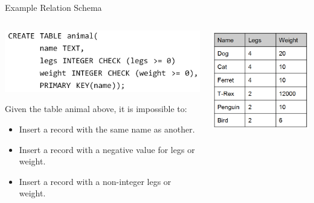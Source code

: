 \documentclass[aspectratio=169]{../latex_main/tntbeamer}  %
\begin{document}
	\begin{frame}{Example Relation Schema}
	    \begin{columns}
	        \begin{column}{.6\textwidth}
	             \begin{center}
	                \includegraphics[scale=.35]{Bild2}
	             \end{center}
	             Given the table animal above, it is impossible to:
	             \begin{itemize}
	                 \item Insert a record with the same name as another.
	                 \item Insert a record with a negative value for legs or weight.
	                 \item Insert a record with a non-integer legs or weight.
	             \end{itemize}
	        \end{column}
	        
	        
	        
	        \begin{column}{.4\textwidth}
	                \begin{center}
	                    \includegraphics[scale=.35]{Bild3}
	                \end{center}
	        \end{column}
	    \end{columns}
	\end{frame}
	
\end{document}

